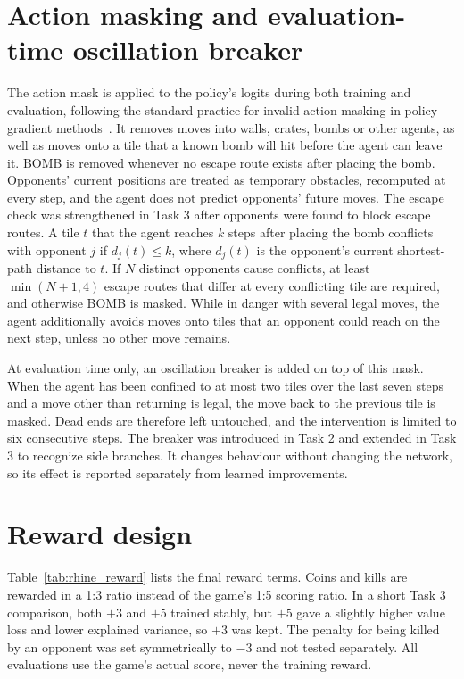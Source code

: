 \documentclass[11pt,a4paper]{report}
\begin{document}
	
	\section{Action masking and evaluation-time oscillation breaker}
	\label{subsec:rhine_mask}
	
	The action mask is applied to the policy's logits during both training and evaluation, following the standard practice for invalid-action masking in policy gradient methods~\cite{huang2022masking}. It removes moves into walls, crates, bombs or other agents, as well as moves onto a tile that a known bomb will hit before the agent can leave it. BOMB is removed whenever no escape route exists after placing the bomb. Opponents' current positions are treated as temporary obstacles, recomputed at every step, and the agent does not predict opponents' future moves. The escape check was strengthened in Task 3 after opponents were found to block escape routes. A tile $t$ that the agent reaches $k$ steps after placing the bomb conflicts with opponent $j$ if $d_j(t) \le k$, where $d_j(t)$ is the opponent's current shortest-path distance to $t$. If $N$ distinct opponents cause conflicts, at least $\min(N+1, 4)$ escape routes that differ at every conflicting tile are required, and otherwise BOMB is masked. While in danger with several legal moves, the agent additionally avoids moves onto tiles that an opponent could reach on the next step, unless no other move remains. 
	
	At evaluation time only, an oscillation breaker is added on top of this mask. When the agent has been confined to at most two tiles over the last seven steps and a move other than returning is legal, the move back to the previous tile is masked. Dead ends are therefore left untouched, and the intervention is limited to six consecutive steps. The breaker was introduced in Task 2 and extended in Task 3 to recognize side branches. It changes behaviour without changing the network, so its effect is reported separately from learned improvements.
	
	\section{Reward design}
	\label{subsec:rhine_reward}
	
	Table~\ref{tab:rhine_reward} lists the final reward terms. Coins and kills are rewarded in a 1:3 ratio instead of the game's 1:5 scoring ratio. In a short Task 3 comparison, both $+3$ and $+5$ trained stably, but $+5$ gave a slightly higher value loss and lower explained variance, so $+3$ was kept. The penalty for being killed by an opponent was set symmetrically to $-3$ and not tested separately. All evaluations use the game's actual score, never the training reward.
	
\end{document}
